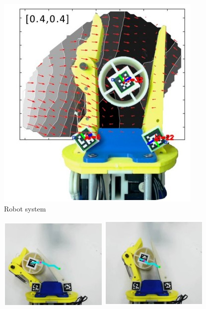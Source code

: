 \documentclass[a4paper,twoside,12pt,papersize, dvipdfmx]{iirthesis}
\begin{document}
\begin{figure}[b]
	\centering
	\includegraphics[width=0.3\hsize]{fig/Introduction/bircher/handsystem.jpg}
	\caption{Robot system \cite{bircher2019}}
	\label{fig::system}
\end{figure}
\begin{figure}[b]
\centering
\begin{minipage}{0.24\hsize}
\centering
\includegraphics[width=\hsize]{fig/Introduction/bircher/mani_a.jpg}
\subcaption{}
\end{minipage}
\begin{minipage}{0.24\hsize}
\centering
\includegraphics[width=\hsize]{fig/Introduction/bircher/mani_b.jpg}

\end{minipage}
\end{figure}
\end{document}
